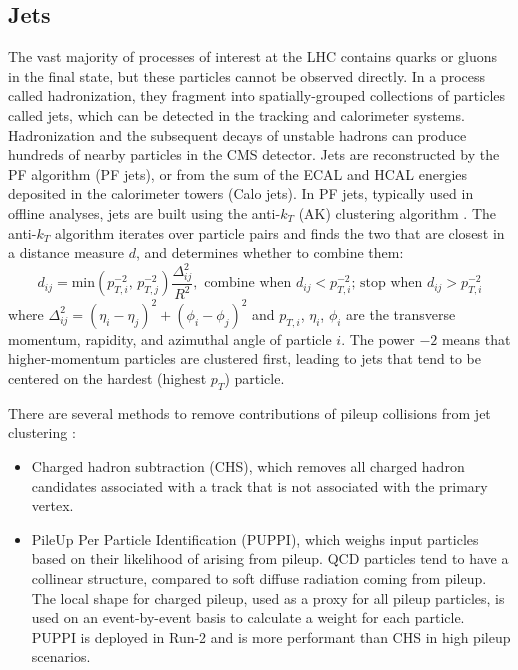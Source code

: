 \subsection{Jets}
The vast majority of processes of interest at the LHC contains quarks or gluons in the final state, but these particles cannot be observed directly. In a process called hadronization, they fragment into spatially-grouped collections of particles called jets, which can be detected in the tracking and calorimeter systems. Hadronization and the subsequent decays of unstable hadrons can produce hundreds of nearby particles in the CMS detector. Jets are reconstructed by the PF algorithm (PF jets), or from the sum of the ECAL and HCAL energies deposited in the calorimeter towers (Calo jets). In PF jets, typically used in offline analyses, jets are built using the anti-$k_T$ (AK) clustering algorithm \cite{CMS-BTV-12-001}. The anti-$k_T$ algorithm iterates over particle pairs and finds the two that are closest in a distance measure $d$, and determines whether to combine them:
\begin{equation}
    d_{ij} = \text{min} \left(p_{T, i}^{-2}, \, p_{T, j}^{-2} \right) \frac{\Delta_{ij}^2}{R^2}, \, \,
    \text{combine when $d_{ij} < p_{T,i}^{-2}$; stop when $d_{ij} > p_{T, i}^{-2}$}
    \label{eqn:anti-kT}
\end{equation}
where $\Delta_{ij}^2 = (\eta_i - \eta_j)^2 + (\phi_i - \phi_j)^2$ and $p_{T, i}$, $\eta_i$, $\phi_i$ are the transverse momentum, rapidity, and azimuthal angle of particle $i$. The power $-2$ means that higher-momentum particles are clustered first, leading to jets that tend to be centered on the hardest (highest $p_T$) particle.

There are several methods to remove contributions of pileup collisions from jet clustering \cite{CMS-PAS-JME-14-001}:
\begin{itemize}
    \item Charged hadron subtraction (CHS), which removes all charged hadron candidates associated with a track that is not associated with the primary vertex.
    \item PileUp Per Particle Identification (PUPPI), which weighs input particles based on their likelihood of arising from pileup. QCD particles tend to have a collinear structure, compared to soft diffuse radiation coming from pileup. The local shape for charged pileup, used as a proxy for all pileup particles, is used on an event-by-event basis to calculate a weight for each particle. PUPPI is deployed in Run-2 and is more performant than CHS in high pileup scenarios.
\end{itemize}


